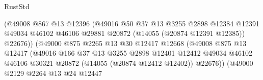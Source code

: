 \begin{lexlean}{RustStd}
\begin{coremodule}
                                        (@49008
                                          @867
                                          @13
                                          @12396
                                          (@49016
                                            @50
                                            @37
                                            @13
                                            @3255
                                            @2898
                                            @12384
                                            @12391
                                            @49034
                                            @46102
                                            @46106
                                            @29881
                                            @20872
                                            (@14055 (@20874 @12391 @12385))
                                            @22676))
                                        (@49000
                                          @875
                                          @2265
                                          @13
                                          @30
                                          @12417
                                          @12668
                                          (@49008
                                            @875
                                            @13
                                            @12417
                                            (@49016
                                              @166
                                              @37
                                              @13
                                              @3255
                                              @2898
                                              @12401
                                              @12412
                                              @49034
                                              @46102
                                              @46106
                                              @30321
                                              @20872
                                              (@14055 (@20874 @12412 @12402))
                                              @22676))
                                          (@49000
                                            @2129
                                            @2264
                                            @13
                                            @24
                                            @12447

\end{coremodule}
\end{lexlean}
